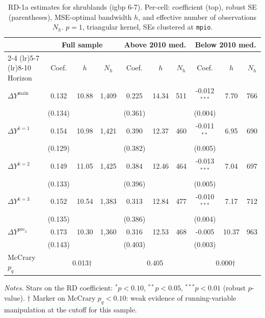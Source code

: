 \documentclass[11pt]{article}
\begin{document}
\begin{table}[H]
\centering
\scriptsize
\caption{RD-1a estimates for shrublands (igbp 6-7). Per-cell: coefficient
(top), robust SE (parentheses), MSE-optimal bandwidth $h$, and
effective number of observations $N_h$. $p=1$, triangular kernel,
SEs clustered at \texttt{mpio}.}
\label{tab:rdplot_rd1a_shrublands}
\begin{tabular}{l ccc ccc ccc}
\toprule
 & \multicolumn{3}{c}{Full sample} & \multicolumn{3}{c}{Above 2010 med.} & \multicolumn{3}{c}{Below 2010 med.} \\
\cmidrule(lr){2-4} \cmidrule(lr){5-7} \cmidrule(lr){8-10}
Horizon & Coef. & $h$ & $N_h$ & Coef. & $h$ & $N_h$ & Coef. & $h$ & $N_h$ \\
\midrule
$\Delta Y^{\text{main}}$ & 0.132 & 10.88 & 1,409 & 0.225 & 14.34 & 511 & -0.012$^{***}$ & 7.70 & 766 \\
 & (0.134) &  &  & (0.361) &  &  & (0.004) &  &  \\
\addlinespace[1pt]
$\Delta Y^{k=1}$ & 0.154 & 10.98 & 1,421 & 0.390 & 12.37 & 460 & -0.011$^{**}$ & 6.95 & 690 \\
 & (0.129) &  &  & (0.382) &  &  & (0.005) &  &  \\
\addlinespace[1pt]
$\Delta Y^{k=2}$ & 0.149 & 11.05 & 1,425 & 0.384 & 12.46 & 464 & -0.013$^{***}$ & 7.04 & 697 \\
 & (0.133) &  &  & (0.396) &  &  & (0.005) &  &  \\
\addlinespace[1pt]
$\Delta Y^{k=3}$ & 0.152 & 10.54 & 1,383 & 0.313 & 12.84 & 477 & -0.010$^{***}$ & 7.17 & 712 \\
 & (0.135) &  &  & (0.386) &  &  & (0.004) &  &  \\
\addlinespace[1pt]
$\Delta Y^{\text{pre}_3}$ & 0.173 & 10.30 & 1,360 & 0.316 & 12.53 & 468 & -0.005 & 10.37 & 963 \\
 & (0.143) &  &  & (0.403) &  &  & (0.003) &  &  \\
\addlinespace[1pt]
\midrule
McCrary $p_q$ & \multicolumn{3}{c}{0.013$\dagger$} & \multicolumn{3}{c}{0.405} & \multicolumn{3}{c}{0.000$\dagger$} \\
\bottomrule
\end{tabular}
\begin{flushleft}\footnotesize
\textit{Notes.} Stars on the RD coefficient: $^{*}p<0.10$,
$^{**}p<0.05$, $^{***}p<0.01$ (robust $p$-value).
$\dagger$ Marker on McCrary $p_q<0.10$: weak evidence of running-variable manipulation at the cutoff for this sample.\\
\end{flushleft}
\end{table}
\end{document}
